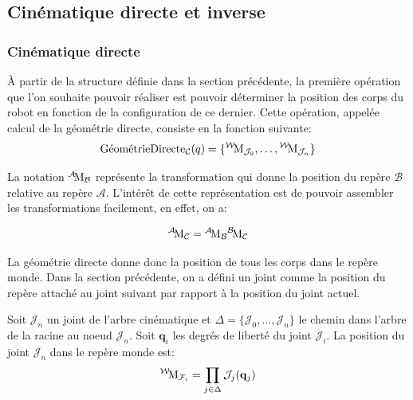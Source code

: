 \subsection{Cinématique directe et inverse}

\subsubsection{Cinématique directe}

À partir de la structure définie dans la section précédente, la
première opération que l'on souhaite pouvoir réaliser est pouvoir
déterminer la position des corps du robot en fonction de la
configuration de ce dernier. Cette opération, appelée calcul de la géométrie directe, consiste en la fonction suivante:
\begin{equation}
  \text{GéométrieDirecte}_{\mathcal{C}}(q) = \{
  {}^{\mathcal{W}}\!\text{M}_{\mathcal{J}_0}, \dotsc,
  {}^{\mathcal{W}}\!\text{M}_{\mathcal{J}_n} \}
\end{equation}

La notation ${}^{\mathcal{A}}\!\text{M}_{\mathcal{B}}$ représente la
transformation qui donne la position du repère $\mathcal{B}$ relative
au repère $\mathcal{A}$. L'intérêt de cette représentation est de
pouvoir assembler les transformations facilement, en effet, on a:

\begin{equation}
  {}^{\mathcal{A}}\!\text{M}_{\mathcal{C}} = {}^{\mathcal{A}}\!\text{M}_{\mathcal{B}} {}^{\mathcal{B}}\!\text{M}_{\mathcal{C}}
\end{equation}


La géométrie directe donne donc la position de tous les corps dans le
repère monde. Dans la section précédente, on a défini un joint comme
la position du repère attaché au joint suivant par rapport à la
position du joint actuel.

\begin{mydef}\label{def:chap2-geomdirect}
Soit $\mathcal{J}_n$ un joint de l'arbre cinématique et $\Delta =
\{\mathcal{J}_0, \dotsc, \mathcal{J}_n\}$ le chemin dans l'arbre de la
racine au noeud $\mathcal{J}_n$. Soit $\mathbf{q}_i$ les degrés de
liberté du joint $\mathcal{J}_i$. La position du joint $\mathcal{J}_n$
dans le repère monde est:
\begin{equation}
  {}^{\mathcal{W}}\!\text{M}_{\mathcal{F}_i} = \prod_{j \in \Delta} \mathcal{J}_j (\mathbf{q}_j)
\end{equation}
\end{mydef}


